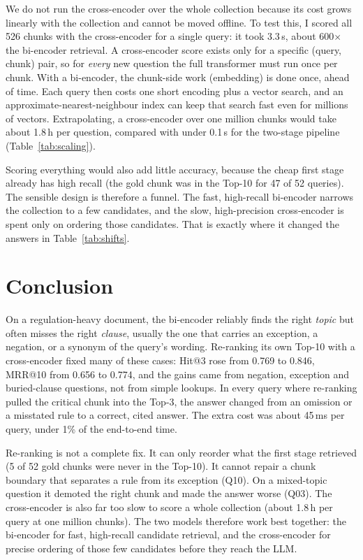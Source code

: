 \documentclass[11pt,a4paper]{article}
\begin{document}
We do not run the cross-encoder over the whole collection because its cost grows linearly with the collection and
cannot be moved offline. To test this, I scored all 526 chunks with the cross-encoder for a single query: it took
3.3\,s, about 600$\times$ the bi-encoder retrieval. A cross-encoder score exists only for a specific
(query, chunk) pair, so for \emph{every} new question the full transformer must run once per chunk. With a
bi-encoder, the chunk-side work (embedding) is done once, ahead of time. Each query then costs one short encoding
plus a vector search, and an approximate-nearest-neighbour index can keep that search fast even for millions of
vectors. Extrapolating, a cross-encoder over one million chunks would take about 1.8\,h per question, compared with
under 0.1\,s for the two-stage pipeline (Table~\ref{tab:scaling}).

Scoring everything would also add little accuracy, because the cheap first stage already has high recall (the gold
chunk was in the Top-10 for 47 of 52 queries). The sensible design is therefore a funnel. The fast, high-recall
bi-encoder narrows the collection to a few candidates, and the slow, high-precision cross-encoder is spent only on
ordering those candidates. That is exactly where it changed the answers in Table~\ref{tab:shifts}.

\section{Conclusion}

On a regulation-heavy document, the bi-encoder reliably finds the right \emph{topic} but often misses the right
\emph{clause}, usually the one that carries an exception, a negation, or a synonym of the query's wording. Re-ranking
its own Top-10 with a cross-encoder fixed many of these cases: Hit@3 rose from 0.769 to 0.846, MRR@10 from 0.656 to
0.774, and the gains came from negation, exception and buried-clause questions, not from simple lookups. In every
query where re-ranking pulled the critical chunk into the Top-3, the answer changed from an omission or a misstated
rule to a correct, cited answer. The extra cost was about 45\,ms per query, under 1\% of the end-to-end time.

Re-ranking is not a complete fix. It can only reorder what the first stage retrieved (5 of 52 gold chunks were never
in the Top-10). It cannot repair a chunk boundary that separates a rule from its exception (Q10). On a mixed-topic
question it demoted the right chunk and made the answer worse (Q03). The cross-encoder is also far too slow to score
a whole collection (about 1.8\,h per query at one million chunks). The two models therefore work best together: the
bi-encoder for fast, high-recall candidate retrieval, and the cross-encoder for precise ordering of those few
candidates before they reach the LLM.
\end{document}
